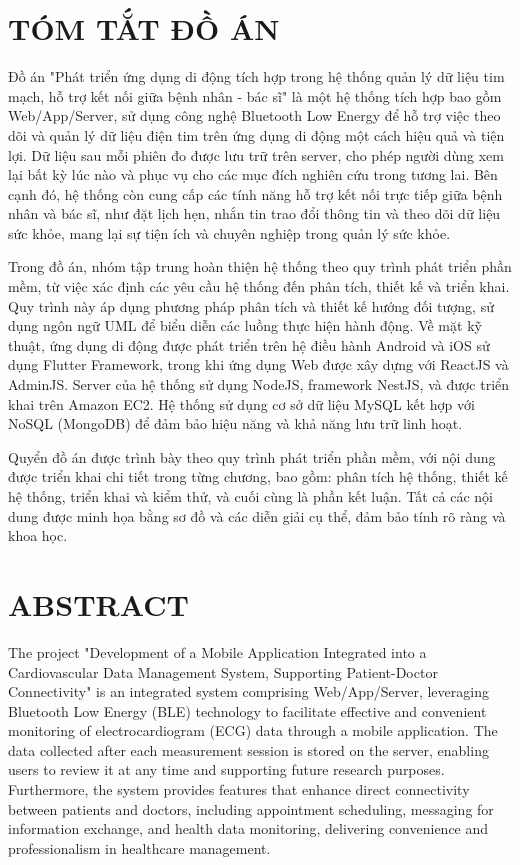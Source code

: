 \section*{TÓM TẮT ĐỒ ÁN}
Đồ án "Phát triển ứng dụng di động tích hợp trong hệ thống quản lý dữ liệu tim mạch, hỗ trợ kết nối giữa bệnh nhân - bác sĩ" là một hệ thống tích hợp bao gồm Web/App/Server, sử dụng công nghệ Bluetooth Low Energy để hỗ trợ việc theo dõi và quản lý dữ liệu điện tim trên ứng dụng di động một cách hiệu quả và tiện lợi. Dữ liệu sau mỗi phiên đo được lưu trữ trên server, cho phép người dùng xem lại bất kỳ lúc nào và phục vụ cho các mục đích nghiên cứu trong tương lai. Bên cạnh đó, hệ thống còn cung cấp các tính năng hỗ trợ kết nối trực tiếp giữa bệnh nhân và bác sĩ, như đặt lịch hẹn, nhắn tin trao đổi thông tin và theo dõi dữ liệu sức khỏe, mang lại sự tiện ích và chuyên nghiệp trong quản lý sức khỏe.

Trong đồ án, nhóm tập trung hoàn thiện hệ thống theo quy trình phát triển phần mềm, từ việc xác định các yêu cầu hệ thống đến phân tích, thiết kế và triển khai. Quy trình này áp dụng phương pháp phân tích và thiết kế hướng đối tượng, sử dụng ngôn ngữ UML để biểu diễn các luồng thực hiện hành động. Về mặt kỹ thuật, ứng dụng di động được phát triển trên hệ điều hành Android và iOS sử dụng Flutter Framework, trong khi ứng dụng Web được xây dựng với ReactJS và AdminJS. Server của hệ thống sử dụng NodeJS, framework NestJS, và được triển khai trên Amazon EC2. Hệ thống sử dụng cơ sở dữ liệu MySQL kết hợp với NoSQL (MongoDB) để đảm bảo hiệu năng và khả năng lưu trữ linh hoạt.

Quyển đồ án được trình bày theo quy trình phát triển phần mềm, với nội dung được triển khai chi tiết trong từng chương, bao gồm: phân tích hệ thống, thiết kế hệ thống, triển khai và kiểm thử, và cuối cùng là phần kết luận. Tất cả các nội dung được minh họa bằng sơ đồ và các diễn giải cụ thể, đảm bảo tính rõ ràng và khoa học.

\newpage
\section*{ABSTRACT}
The project "Development of a Mobile Application Integrated into a Cardiovascular Data Management System, Supporting Patient-Doctor Connectivity" is an integrated system comprising Web/App/Server, leveraging Bluetooth Low Energy (BLE) technology to facilitate effective and convenient monitoring of electrocardiogram (ECG) data through a mobile application. The data collected after each measurement session is stored on the server, enabling users to review it at any time and supporting future research purposes. Furthermore, the system provides features that enhance direct connectivity between patients and doctors, including appointment scheduling, messaging for information exchange, and health data monitoring, delivering convenience and professionalism in healthcare management.

